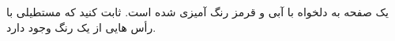 \exercise
يک صفحه به دلخواه با آبی و قرمز رنگ آميزی شده است. ثابت کنيد که مستطيلی با رأس هايی از يک رنگ وجود دارد.